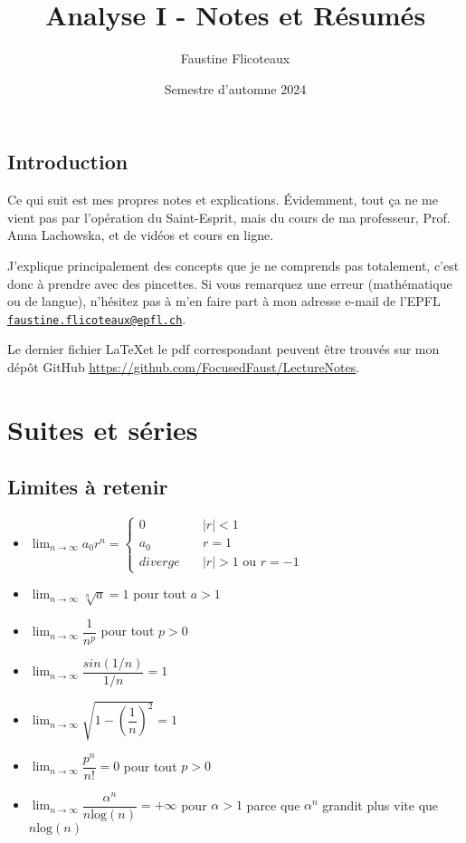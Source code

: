 \documentclass[10pt,a4paper]{book}
\title{Analyse I - Notes et Résumés}
\author{Faustine Flicoteaux}
\date{Semestre d'automne 2024}
\begin{document}
\maketitle
\tableofcontents
\newpage


\section*{Introduction}
Ce qui suit est mes propres notes et explications. Évidemment, tout ça ne me vient pas par l'opération du Saint-Esprit, mais du cours de ma professeur, Prof. Anna Lachowska, et de vidéos et cours en ligne.\par 
J'explique principalement des concepts que je ne comprends pas totalement, c'est donc à prendre avec des pincettes. Si vous remarquez une erreur (mathématique ou de langue), n'hésitez pas à m'en faire part à mon adresse e-mail de l'EPFL \texttt{\href{mailto:faustine.flicoteaux@epfl.ch}{faustine.flicoteaux@epfl.ch}}.\par 
Le dernier fichier \LaTeX et le pdf correspondant peuvent être trouvés sur mon dépôt GitHub \url{https://github.com/FocusedFaust/LectureNotes}.

\chapter{Suites et séries}
\section{Limites à retenir}
\begin{itemize}
\item $\lim_{n\to\infty} a_0r^n = \left\{
        \begin{array}{ll}
            0 & \quad |r| < 1\\
            a_0 & \quad r = 1\\
            diverge & \quad |r| > 1 \text{ ou } r = -1
        \end{array}\right.$
\item $\lim_{n\to\infty} \sqrt[n]{a} = 1$ pour tout $a > 1$
\item $\lim_{n\to\infty} \dfrac{1}{n^p}$ pour tout $p > 0$
\item $\lim_{n\to\infty} \dfrac{sin(1/n)}{1/n} = 1$
\item $\lim_{n\to\infty} \sqrt{1-(\dfrac{1}{n})^2} = 1$
\item $\lim_{n\to\infty} \dfrac{p^n}{n!} = 0$ pour tout $p > 0$
\item $\lim_{n\to\infty} \dfrac{\alpha^n}{n\text{log}(n)} = +\infty$ pour $\alpha>1$ parce que $\alpha^n$ grandit plus vite que $n\text{log}(n)$
\end{itemize}
\end{document}
